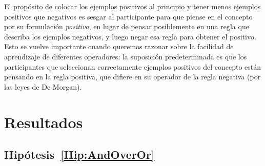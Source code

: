El propósito de colocar los ejemplos positivos al principio y tener menos ejemplos positivos que negativos es sesgar al participante para que piense en el concepto por su formulación {\em positiva}, en lugar de pensar posiblemente en una regla que describa los ejemplos negativos, y luego negar esa regla para obtener el positivo. Esto se vuelve importante cuando queremos razonar sobre la facilidad de aprendizaje de diferentes operadores: la suposición predeterminada es que los participantes que seleccionan correctamente ejemplos positivos del concepto están pensando en la regla positiva, que difiere en su operador de la regla negativa (por las leyes de De Morgan).


\section{Resultados}\label{Results}


\subsection{Hipótesis~\ref{Hip:AndOverOr}}\label{Results:AndOverOr}

